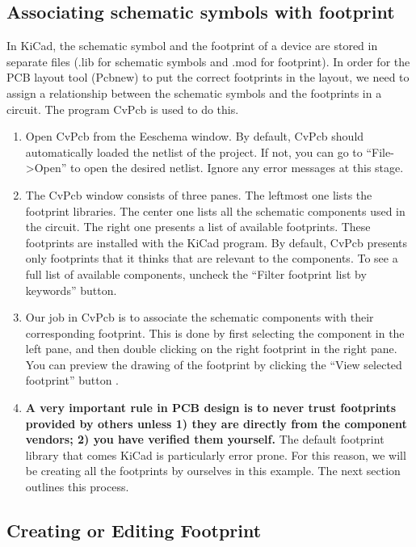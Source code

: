 \documentclass[12pt,letterpaper]{scrartcl}
\begin{document}
\subsection{Associating schematic symbols with footprint}
In KiCad, the schematic symbol and the footprint of a device are stored in separate files (.lib for schematic symbols and .mod for footprint). In order for the PCB layout tool (Pcbnew) to put the correct footprints in the layout, we need to assign a relationship between the schematic symbols and the footprints in a circuit. The program CvPcb is used to do this. 

\begin{enumerate}
	\item Open CvPcb from the Eeschema window. By default, CvPcb should automatically loaded the netlist of the project. If not, you can go to “File->Open” to open the desired netlist. Ignore any error messages at this stage.
	
	\item The CvPcb window consists of three panes. The leftmost one lists the footprint libraries. The center one lists all the schematic components used in the circuit. The right one presents a list of available footprints. These footprints are installed with the KiCad program. By default, CvPcb presents only footprints that it thinks that are relevant to the components. To see a full list of available components, uncheck the ``Filter footprint list by keywords'' button. 
	
	\item Our job in CvPcb is to associate the schematic components with their corresponding footprint. This is done by first selecting the component in the left pane, and then double clicking on the right footprint in the right pane. You can preview the drawing of the footprint by clicking the ``View selected footprint'' button . 
	
	\item \textbf{A very important rule in PCB design is to never trust footprints provided by others unless 1) they are directly from the component vendors; 2) you have verified them yourself.} The default footprint library that comes KiCad is particularly error prone. For this reason, we will be creating all the footprints by ourselves in this example. The next section outlines this process. 
\end{enumerate}

\subsection{Creating or Editing Footprint}
\end{document}
